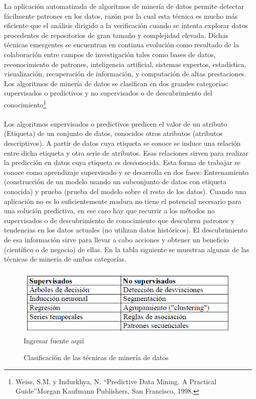 \documentclass[a4paper,openright,12pt]{book}
\theoremstyle{definition}
\theoremstyle{remark}
\begin{document}
La aplicación automatizada de algoritmos de minería de datos permite detectar fácilmente patrones en los datos, razón por la cual esta técnica es mucho más eficiente que el análisis dirigido a la verificación cuando se intenta explorar datos procedentes de repositorios de gran tamaño y complejidad elevada. Dichas técnicas emergentes se encuentran en continua evolución como resultado de la colaboración entre campos de investigación tales como bases de datos, reconocimiento de patrones, inteligencia artificial, sistemas expertos, estadística, visualización, recuperación de información, y computación de altas prestaciones. Los algoritmos de minería de datos se clasifican en dos grandes categorías: supervisados o predictivos y no supervisados o de descubrimiento del conocimiento\footnote{Weiss, S.M. y Indurkhya, N. “Predictive Data Mining. A Practical Guide”Morgan Kaufmann Publishers, San Francisco, 1998.}\\\\
Los algoritmos supervisados o predictivos predicen el valor de un atributo (Etiqueta) de un conjunto de datos, conocidos otros atributos (atributos descriptivos). A partir de datos cuya etiqueta se conoce se induce una relación entre dicha etiqueta y otra serie de atributos. Esas relaciones sirven para realizar la predicción en datos cuya etiqueta es desconocida. Esta forma de trabajar se conoce como aprendizaje supervisado y se desarrolla en dos fases: Entrenamiento (construcción de un modelo usando un subconjunto de datos con etiqueta conocida) y prueba (prueba del modelo sobre el resto de los datos). Cuando una aplicación no es lo suficientemente madura no tiene el potencial necesario para una solución predictiva, en ese caso hay que recurrir a los métodos no supervisados o de descubrimiento de  conocimiento que descubren patrones y tendencias en los datos actuales (no utilizan datos históricos). El descubrimiento de esa información sirve para llevar a cabo acciones y obtener un beneficio (científico o de negocio) de ellas. En la tabla siguiente se muestran algunas de las técnicas de minería de ambas categorías.

\begin{figure}[htb]
\centering
\caption{Clasificación de las técnicas de minería de datos} 
\includegraphics[scale=0.7]{Tabla1}
\label{fig:Tabla1}
\\Ingresar fuente aquí
\end{figure}
\end{document}

